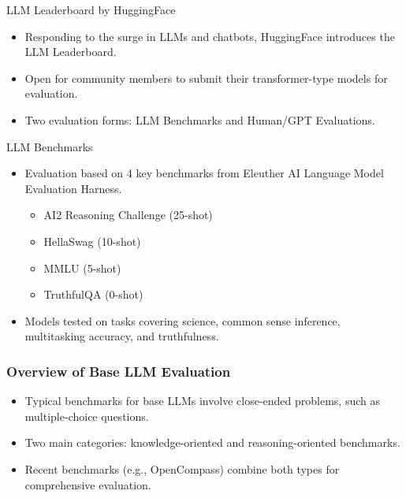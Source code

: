 \documentclass[handout]{beamer}
\begin{document}
\begin{frame}{LLM Leaderboard by HuggingFace}
  \begin{itemize}
    \item Responding to the surge in LLMs and chatbots, HuggingFace introduces the LLM Leaderboard.
    \item Open for community members to submit their transformer-type models for evaluation.
    \item Two evaluation forms: LLM Benchmarks and Human/GPT Evaluations.
  \end{itemize}
\end{frame}

\begin{frame}{LLM Benchmarks}
  \begin{itemize}
    \item Evaluation based on 4 key benchmarks from Eleuther AI Language Model Evaluation Harness.
      \begin{scriptsize}
      \begin{itemize}
        \item AI2 Reasoning Challenge (25-shot)
        \item HellaSwag (10-shot)
        \item MMLU (5-shot)
        \item TruthfulQA (0-shot)
      \end{itemize}
      \end{scriptsize}
    \item Models tested on tasks covering science, common sense inference, multitasking accuracy, and truthfulness.
  \end{itemize}
\end{frame}


\begin{frame}[t]
  \frametitle{Overview of Base LLM Evaluation}
  \begin{itemize}
    \item Typical benchmarks for base LLMs involve close-ended problems, such as multiple-choice questions.
    \item Two main categories: knowledge-oriented and reasoning-oriented benchmarks.
    \item Recent benchmarks (e.g., OpenCompass) combine both types for comprehensive evaluation.
  \end{itemize}
\end{frame}
\end{document}

